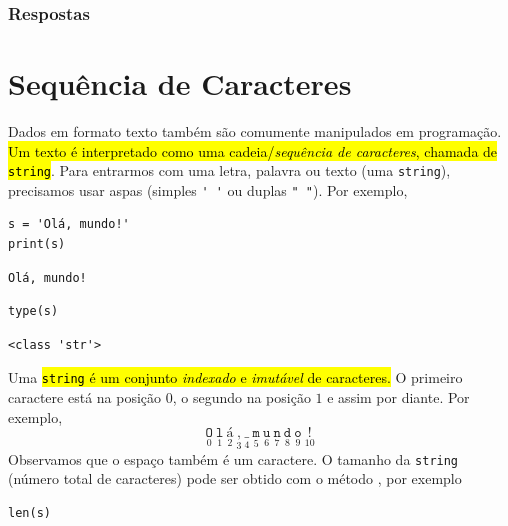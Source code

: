 \subsubsection{Respostas}
\shipoutAnswer
\fi

\section{Sequência de Caracteres}\label{cap_lingua_sec_string}

Dados em formato texto também são comumente manipulados em programação. \hl{Um texto é interpretado como uma cadeia/\emph{sequência de caracteres}}\hl{, chamada de \texttt{string}}. Para entrarmos com uma letra, palavra ou texto (uma \texttt{string}), precisamos usar aspas (simples \lstinline+' '+ ou duplas \lstinline+" "+). Por exemplo,

\begin{lstlisting}
s = 'Olá, mundo!'
print(s)
\end{lstlisting}

\begin{verbatim}
Olá, mundo!  
\end{verbatim}

\begin{lstlisting}
type(s)
\end{lstlisting}

\begin{verbatim}
<class 'str'>
\end{verbatim}

Uma \hl{\texttt{string} é um conjunto \emph{indexado} e \emph{imutável} de caracteres.} O primeiro caractere está na posição $0$, o segundo na posição $1$ e assim por diante. Por exemplo,
\begin{equation}
  \underset{0}{\texttt{O}}~\underset{1}{\texttt{l}}~\underset{2}{\texttt{á}}~\underset{3}{\texttt{,}}~\underset{4}{\texttt{\_}}~\underset{5}{\texttt{m}}~\underset{6}{\texttt{u}}~\underset{7}{\texttt{n}}~\underset{8}{\texttt{d}}~\underset{9}{\texttt{o}}~\underset{10}{\texttt{!}}
\end{equation}
Observamos que o espaço também é um caractere. O tamanho da \texttt{string} (número total de caracteres) pode ser obtido com o método {\PYTHONlen}, por exemplo

\begin{lstlisting}
len(s)
\end{lstlisting}

